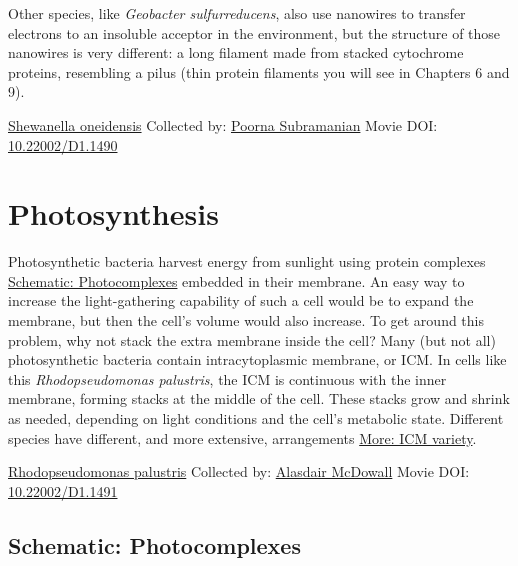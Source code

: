 \documentclass[]{tufte-book}
\begin{document}
Other species, like \emph{Geobacter sulfurreducens}, also use nanowires to transfer electrons to an insoluble acceptor in the environment, but the structure of those nanowires is very different: a long filament made from stacked cytochrome proteins, resembling a pilus (thin protein filaments you will see in Chapters 6 and 9).



\hypertarget{htmlwidget-7c1ab4ff1d9437f0300b}{}

\label{fig:4-2}\protect\hyperlink{tree}{Shewanella oneidensis} Collected by: \protect\hyperlink{poorna_subramanian}{Poorna Subramanian} Movie DOI: \href{https://doi.org/10.22002/D1.1490}{10.22002/D1.1490}

\hypertarget{photosynthesis}{%
\section{Photosynthesis}\label{photosynthesis}}

Photosynthetic bacteria harvest energy from sunlight using protein complexes \protect\hyperlink{Photocomplexes}{Schematic: Photocomplexes} embedded in their membrane. An easy way to increase the light-gathering capability of such a cell would be to expand the membrane, but then the cell's volume would also increase. To get around this problem, why not stack the extra membrane inside the cell? Many (but not all) photosynthetic bacteria contain intracytoplasmic membrane, or ICM. In cells like this \emph{Rhodopseudomonas palustris}, the ICM is continuous with the inner membrane, forming stacks at the middle of the cell. These stacks grow and shrink as needed, depending on light conditions and the cell's metabolic state. Different species have different, and more extensive, arrangements \protect\hyperlink{ICM_variety}{More: ICM variety}.



\hypertarget{htmlwidget-49fa91d90334d9bc5fe2}{}

\label{fig:4-3}\protect\hyperlink{tree}{Rhodopseudomonas palustris} Collected by: \protect\hyperlink{alasdair_mcdowall}{Alasdair McDowall} Movie DOI: \href{https://doi.org/10.22002/D1.1491}{10.22002/D1.1491}

\hypertarget{Photocomplexes}{%
\subsection*{Schematic: Photocomplexes}\label{Photocomplexes}}
\end{document}
